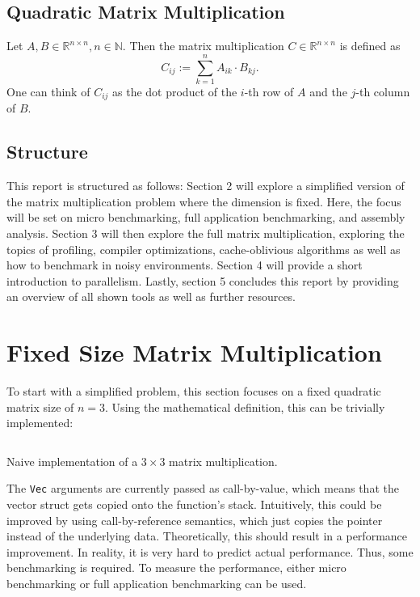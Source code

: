 \subsection{Quadratic Matrix Multiplication}

Let $A, B \in \mathbb{R}^{n\times n}, n \in \mathbb{N}$. Then the matrix multiplication $C \in \mathbb{R}^{n \times n}$ is defined as
\[
  C_{ij} := \sum_{k=1}^n A_{ik} \cdot B_{kj}.
\]
One can think of $C_{ij}$ as the dot product of the $i$-th row of $A$ and the $j$-th column of $B$.

\subsection{Structure}
This report is structured as follows: Section 2 will explore a simplified version of the matrix multiplication problem where the dimension is fixed. Here, the focus will be set on micro benchmarking, full application benchmarking, and assembly analysis. Section 3 will then explore the full matrix multiplication, exploring the topics of profiling, compiler optimizations, cache-oblivious algorithms as well as how to benchmark in noisy environments. Section 4 will provide a short introduction to parallelism. Lastly, section 5 concludes this report by providing an overview of all shown tools as well as further resources.

\section{Fixed Size Matrix Multiplication}
To start with a simplified problem, this section focuses on a fixed quadratic matrix size of $n=3$. Using the mathematical definition, this can be trivially implemented:

\begin{listing}[H]
  \inputminted{rust}{./assets/first_impl.rs}
\caption{Naive implementation of a $3\times3$ matrix multiplication.}
\end{listing}

The \texttt{Vec} arguments are currently passed as call-by-value, which means that the vector struct gets copied onto the function's stack. Intuitively, this could be improved by using call-by-reference semantics, which just copies the pointer instead of the underlying data. Theoretically, this should result in a performance improvement. In reality, it is very hard to predict actual performance. Thus, some benchmarking is required. To measure the performance, either micro benchmarking or full application benchmarking can be used.

